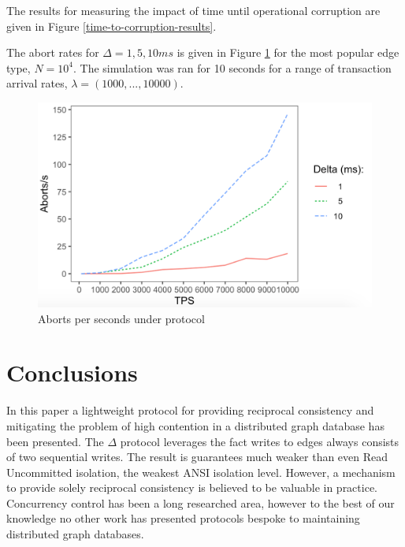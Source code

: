 \documentclass[sigplan,10pt]{acmart}
\begin{document}
The results for measuring the impact of time until operational corruption are given in Figure \ref{time-to-corruption-results}. %

The abort rates for $\Delta = 1, 5, 10ms$ is given in Figure \ref{aborts-results} for the most popular edge type, $N=10^4$. The simulation was ran for 10 seconds for a range of transaction arrival rates, $\lambda = (1000, ..., 10000)$.


\begin{figure}[h]
  \centering
  \includegraphics[width=\linewidth]{./images/aborts}
  \caption{Aborts per seconds under protocol}
  \label{aborts-results}
\end{figure}


\section{Conclusions}

In this paper a lightweight protocol for providing reciprocal consistency and mitigating the problem of high contention in a distributed graph database has been presented. The $\Delta$ protocol leverages the fact writes to edges always consists of two sequential writes. The result is guarantees much weaker than even Read Uncommitted isolation, the weakest ANSI isolation level. However, a mechanism to provide solely reciprocal consistency is believed to be valuable in practice. Concurrency control has been a long researched area, however to the best of our knowledge no other work has presented protocols bespoke to maintaining distributed graph databases.
\end{document}
